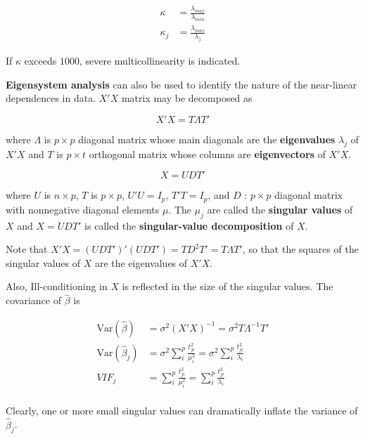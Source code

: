 \documentclass[12pt]{article}
\begin{document}
$$
\begin{aligned}
\kappa &= \frac{\lambda_{max}}{\lambda_{min}} \\[8pt]
\kappa_j &= \frac{\lambda_{max}}{\lambda_j}
\end{aligned}
$$

If $\kappa$ exceeds $1000$, severe multicollinearity is indicated. 

\textbf{Eigensystem analysis} can also be used to identify the nature of the near-linear dependences in data. $X'X$ matrix may be decomposed as 

$$
X'X = T \Lambda T'
$$

where $\Lambda$ is $p \times p$ diagonal matrix whose main diagonals are the \textbf{eigenvalues} $\lambda_j$ of $X'X$ and $T$ is $p \times t$ orthogonal matrix whose columns are \textbf{eigenvectors} of $X'X$. 


$$
X = UDT'
$$

where $U$ is $n \times p$, $T$ is $p \times p$, $U'U = I_p$, $T'T=I_p$, and $D$ : $p \times p$ diagonal matrix with nonnegative diagonal elements $\mu$. The $\mu_j$ are called the \textbf{singular values} of $X$ and $X = UDT'$ is called the \textbf{singular-value decomposition} of $X$. 

Note that $X'X = (UDT')'(UDT') = TD^2T' = T\Lambda T' $, so that the squares of the singular values of $X$ are the eigenvalues of $X'X$. 

Also, Ill-conditioning in $X$ is reflected in the size of the singular values. The covariance of $\hat{\beta}$ is

$$
\begin{aligned}
\mathrm{Var} (\hat{\beta}) &= \sigma^2 (X'X)^{-1} = \sigma^2 T \Lambda^{-1}T' \\[8pt]
\mathrm{Var} (\hat{\beta}_j) &= \sigma^2 \sum_i^p \frac{t_{ji}^2 }{\mu_i^2} = \sigma^2 \sum_i^p \frac{t_{ji}^2 }{\lambda_i}  \\[10pt]
VIF_j &= \sum_i^p \frac{t_{ji}^2 }{\mu_i^2} = \sum_i^p \frac{t_{ji}^2 }{\lambda_i}  \\[10pt]
\end{aligned}
$$

Clearly, one or more small singular values can dramatically inflate the variance of $\hat{\beta}_j$. 



\pagebreak
\end{document}
